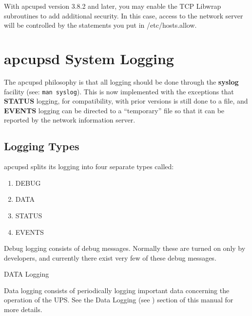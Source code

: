 {{{{{{{With apcupsd version 3.8.2 and later, you may enable the TCP Libwrap
subroutines to add additional security. In this case, access to the network
server will be controlled by the statements you put in /etc/hosts.allow. 

\label{apcupsd-System-Logging}

\section*{apcupsd System Logging}

\label{index-Logging_002c-System-166}
\label{index-System-Logging-167}
The apcupsd philosophy is that all logging should be done through the {\bf
syslog} facility (see: {\tt man syslog}). This is now implemented with the
exceptions that {\bf STATUS} logging, for compatibility, with prior versions
is still done to a file, and {\bf EVENTS} logging can be directed to a
``temporary'' file so that it can be reported by the network information
server. 

\label{Logging-Types}

\subsection*{Logging Types}

\label{index-Logging_002c-types-168}
apcupsd splits its logging into four separate types called:  

\begin{enumerate}
\item DEBUG  
\item DATA  
\item STATUS  
\item EVENTS  
   \end{enumerate}

Debug logging consists of debug messages. Normally these are turned on only by
developers, and currently there exist very few of these debug messages. 

\small{DATA Logging}

Data logging consists of periodically logging important data concerning the
operation of the UPS. See the Data Logging (see 
) section of this manual for more
details. 

}}}}}}}
